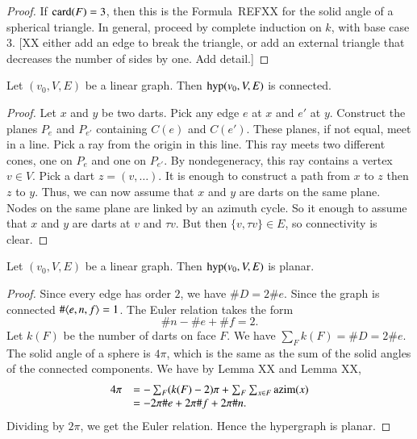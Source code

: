 \begin{proof} If ${\operatorname{card}}(F)=3$, then this is the Formula~REFXX for the solid
angle of a spherical triangle.  In general, proceed by complete
induction on $k$, with base case $3$.  [XX either add an edge to
break the triangle, or add an external triangle that decreases the
number of sides by one.  Add detail.]
\end{proof}

\begin{lemma} Let $(v_0,V,E)$ be a linear graph.  Then ${\operatorname{hyp}}(v_0,V,E)$
is connected.
\end{lemma}

\begin{proof}  Let $x$ and $y$ be two darts.  Pick any edge $e$ at
$x$ and $e'$ at $y$.  Construct the planes $P_e$ and $P_{e'}$
containing $C(e)$ and $C({e'})$.  These planes, if not equal, meet in
a line.  Pick a ray from the origin in this line.  This ray meets
two different cones, one on $P_e$ and one on $P_{e'}$.  By
nondegeneracy, this ray contains a vertex $v\in V$.  Pick a dart $z
= (v,\ldots)$.  It is enough to construct a path from $x$ to $z$
then $z$ to $y$.  Thus, we can now assume that $x$ and $y$ are darts
on the same plane.  Nodes on the same plane are linked by an azimuth
cycle.  So it enough to assume that $x$ and $y$ are darts at $v$ and
$\tau v$.  But then $\{v,\tau v\}\in E$, so connectivity is clear.
\end{proof}

\begin{lemma} Let $(v_0,V,E)$ be a linear graph.  Then ${\operatorname{hyp}}(v_0,V,E)$
is planar.
\end{lemma}

\begin{proof}  Since every edge has order $2$, we have $\# D = 2\#
e$.  Since the graph is connected $\#\langle e,n,f\rangle = 1$.  The Euler
relation takes the form
    $$
    \# n - \# e + \# f = 2.
    $$
Let $k(F)$ be the number of darts on face $F$.  We have $\sum_F k(F)
= \# D = 2 \# e$.  The solid angle of a sphere is $4\pi$, which is
the same as the sum of the solid angles of the connected components.
We have by Lemma XX and Lemma XX,
    \begin{equation}\begin{array}{lll}
    4\pi &= - \sum_F (k(F) - 2)\pi + \sum_F \sum_{x\in
    F}{\operatorname{azim}}(x)\\
        &= - 2 \pi\# e  + 2 \pi\# f  + 2\pi\# n.
    \end{array}
    \end{equation}
Dividing by $2\pi$, we get the Euler relation.  Hence the hypergraph
is planar.
\end{proof}

